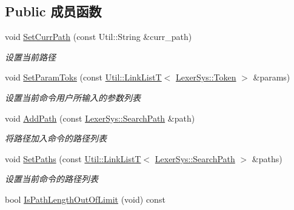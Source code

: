 \subsection*{Public 成员函数}
\begin{DoxyCompactItemize}
\item 
void \hyperlink{class_command_sys_1_1_console_command_a630c500ae469cc33afa8f502b73adcb3}{Set\-Curr\-Path} (const Util\-::\-String \&curr\-\_\-path)
\begin{DoxyCompactList}\small\item\em 设置当前路径 \end{DoxyCompactList}\item 
void \hyperlink{class_command_sys_1_1_console_command_ad467ade07437eef25535a0fc8dc42a02}{Set\-Param\-Toks} (const \hyperlink{class_util_1_1_link_list_t}{Util\-::\-Link\-List\-T}$<$ \hyperlink{class_lexer_sys_1_1_token}{Lexer\-Sys\-::\-Token} $>$ \&params)
\begin{DoxyCompactList}\small\item\em 设置当前命令用户所输入的参数列表 \end{DoxyCompactList}\item 
void \hyperlink{class_command_sys_1_1_console_command_a28c05ba316393a029f5d6c708f4684b3}{Add\-Path} (const \hyperlink{class_lexer_sys_1_1_search_path}{Lexer\-Sys\-::\-Search\-Path} \&path)
\begin{DoxyCompactList}\small\item\em 将路径加入命令的路径列表 \end{DoxyCompactList}\item 
void \hyperlink{class_command_sys_1_1_console_command_a469dcbd51921716a279346b313082fec}{Set\-Paths} (const \hyperlink{class_util_1_1_link_list_t}{Util\-::\-Link\-List\-T}$<$ \hyperlink{class_lexer_sys_1_1_search_path}{Lexer\-Sys\-::\-Search\-Path} $>$ \&paths)
\begin{DoxyCompactList}\small\item\em 设置当前命令的路径列表 \end{DoxyCompactList}\item 
\hypertarget{class_command_sys_1_1_console_command_a775e8cf7b73354f05f44232b9310070e}{bool \hyperlink{class_command_sys_1_1_console_command_a775e8cf7b73354f05f44232b9310070e}{Is\-Path\-Length\-Out\-Of\-Limit} (void) const }\label{class_command_sys_1_1_console_command_a775e8cf7b73354f05f44232b9310070e}


\end{DoxyCompactItemize}
